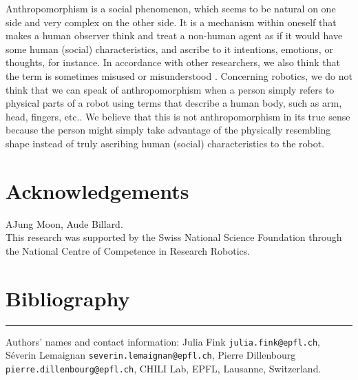\documentclass[lettersize, apacite, twoside, HRI]{apa_HRI}
\begin{document}
	Anthropomorphism is a social phenomenon, which seems to be natural on one side and very complex on the other side. It is a mechanism within oneself that makes a human observer think and treat a non-human agent as if it would have some human (social) characteristics, and ascribe to it intentions, emotions, or thoughts, for instance. In accordance with other researchers, we also think that the term is sometimes misused or misunderstood \cite{duffy_anthropomorphism_2002}. Concerning robotics, we do not think that we can speak of anthropomorphism when a person simply refers to physical parts of a robot using terms that describe a human body, such as arm, head, fingers, etc.. We believe that this is not anthropomorphism in its true sense because the person might simply take advantage of the physically resembling shape instead of truly ascribing human (social) characteristics to the robot.



\section*{Acknowledgements}
AJung Moon, Aude Billard.\\

This research was supported by the Swiss National Science Foundation through
the National Centre of Competence in Research Robotics.

\section{Bibliography}

\hrule
\vspace*{.1in}
Authors' names and contact information: Julia Fink {\tt julia.fink@epfl.ch}, Séverin Lemaignan {\tt severin.lemaignan@epfl.ch}, Pierre Dillenbourg {\tt pierre.dillenbourg@epfl.ch}, CHILI Lab, EPFL, Lausanne, Switzerland.
\end{document}
